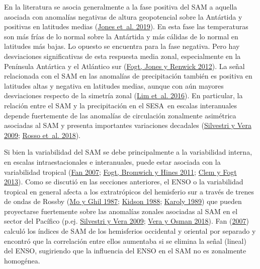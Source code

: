 \documentclass[12pt,oneside,a4paper]{reedthesis}
\begin{document}
En la literatura se asocia generalmente a la fase positiva del SAM a aquella asociada con anomalías negativas de altura geopotencial sobre la Antártida y positivas en latitudes medias (\protect\hyperlink{ref-jones2019}{Jones et~al. 2019}).
En esta fase las temperaturas son más frías de lo normal sobre la Antártida y más cálidas de lo normal en latitudes más bajas.
Lo opuesto se encuentra para la fase negativa.
Pero hay desviaciones significativas de esta respuesta media zonal, especialmente en la Península Antártica y el Atlántico sur (\protect\hyperlink{ref-fogt2012}{Fogt, Jones y Renwick 2012}).
La señal relacionada con el SAM en las anomalías de precipitación también es positiva en latitudes altas y negativa en latitudes medias, aunque con aún mayores desviaciones respecto de la simetría zonal (\protect\hyperlink{ref-lim2016}{Lim et~al. 2016}).
En particular, la relación entre el SAM y la precipitación en el SESA~en escalas interanuales depende fuertemente de las anomalías de circulación zonalmente asimétrica asociadas al SAM y presenta importantes variaciones decadales (\protect\hyperlink{ref-silvestri2009}{Silvestri y Vera 2009}; \protect\hyperlink{ref-rosso2018}{Rosso et~al. 2018}).

Si bien la variabilidad del SAM se debe principalmente a la variabilidad interna, en escalas intraestacionales e interanuales, puede estar asociada con la variabilidad tropical (\protect\hyperlink{ref-fan2007}{Fan 2007}; \protect\hyperlink{ref-fogt2011a}{Fogt, Bromwich y Hines 2011}; \protect\hyperlink{ref-clem2013}{Clem y Fogt 2013}).
Como se discutió en las secciones anteriores, el ENSO o la variabilidad tropical en general afecta a los extratrópicos del hemisferio sur a través de trenes de ondas de Rossby (\protect\hyperlink{ref-mo1987}{Mo y Ghil 1987}; \protect\hyperlink{ref-kidson1988}{Kidson 1988}; \protect\hyperlink{ref-karoly1989}{Karoly 1989}) que pueden proyectarse fuertemente sobre las anomalías zonales asociadas al SAM en el sector del Pacífico (p.ej. \protect\hyperlink{ref-silvestri2009}{Silvestri y Vera 2009}; \protect\hyperlink{ref-vera2018}{Vera y Osman 2018}).
Fan (\protect\hyperlink{ref-fan2007}{2007}) calculó los índices de SAM de los hemisferios occidental y oriental por separado y encontró que la correlación entre ellos aumentaba si se elimina la señal (lineal) del ENSO, sugiriendo que la influencia del ENSO en el SAM no es zonalmente homogénea.
\end{document}
